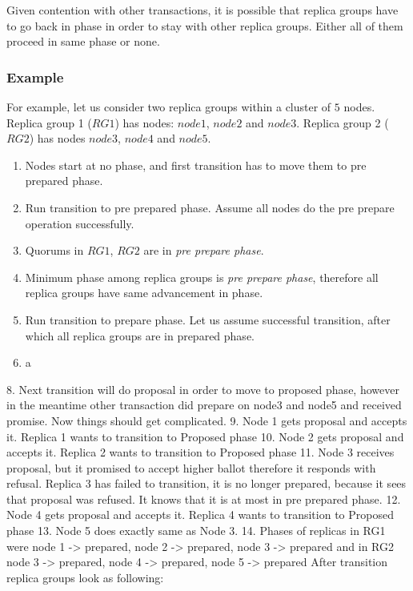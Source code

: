 Given contention with other transactions, it is possible that replica groups have to go back in phase in order to stay with other replica groups. Either all of them proceed in same phase or none.


\subsubsection{Example}
For example, let us consider two replica groups within a cluster of $5$ nodes.
Replica group 1 ($RG1$) has nodes: $node1$, $node2$ and $node3$. 
Replica group 2 ($RG2$) has nodes $node3$, $node4$ and $node5$.

\begin{enumerate}
\item Nodes start at no phase, and first transition has to move them to pre prepared phase.
\item Run transition to pre prepared phase. Assume all nodes do the pre prepare operation successfully.
\item Quorums in $RG1$, $RG2$ are in \emph{pre prepare phase}.
\item Minimum phase among replica groups is \emph{pre prepare phase}, therefore all replica groups have same advancement in phase.
\item Run transition to prepare phase. Let us assume successful transition, after which all replica groups are in prepared phase.
\item a
\end{enumerate}

8. Next transition will do proposal in order to move to proposed phase, however in the meantime other transaction did prepare on node3 and node5 and received promise. Now things should get complicated. 
9. Node 1 gets proposal and accepts it. Replica 1 wants to transition to Proposed phase
10. Node 2 gets proposal and accepts it. Replica 2 wants to transition to Proposed phase
11. Node 3 receives proposal, but it promised to accept higher ballot therefore it responds with refusal. Replica 3 has failed to transition, it is no longer prepared, because it sees that proposal was refused. It knows that it is at most in pre prepared phase. 
12. Node 4 gets proposal and accepts it. Replica 4 wants to transition to Proposed phase
13. Node 5 does exactly same as Node 3.
14. Phases of replicas in RG1 were { node 1 -> prepared, node 2 -> prepared, node 3 -> prepared } and in RG2 { node 3 -> prepared, node 4 -> prepared, node 5 -> prepared }
        After transition replica groups look as following:


